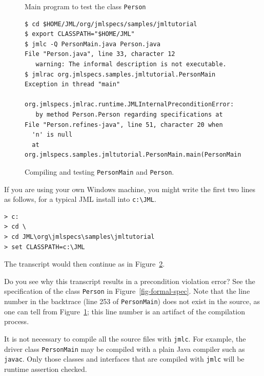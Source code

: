 \documentclass[twocolumn]{article}
\begin{document}
\begin{figure}

\caption{Main program to test the class \texttt{Person}}
\label{fig-class-personmain}
\end{figure}

\begin{figure}
\begin{verbatim}
$ cd $HOME/JML/org/jmlspecs/samples/jmltutorial
$ export CLASSPATH="$HOME/JML"
$ jmlc -Q PersonMain.java Person.java
File "Person.java", line 33, character 12
   warning: The informal description is not executable.
$ jmlrac org.jmlspecs.samples.jmltutorial.PersonMain
Exception in thread "main" 
   org.jmlspecs.jmlrac.runtime.JMLInternalPreconditionError:
   by method Person.Person regarding specifications at
File "Person.refines-java", line 51, character 20 when
  'n' is null
  at org.jmlspecs.samples.jmltutorial.PersonMain.main(PersonMain.java:253)
\end{verbatim}
\caption{Compiling and testing \texttt{PersonMain} and \texttt{Person}.}
\label{fig-class-runpersonmain}
\end{figure}

If you are using your own Windows machine, you might write the first two
lines as follows, for a typical JML install into \verb|c:\JML|.
\begin{verbatim}
> c:
> cd \
> cd JML\org\jmlspecs\samples\jmltutorial
> set CLASSPATH=c:\JML
\end{verbatim}
The transcript would then continue as in Figure~\ref{fig-class-runpersonmain}.

Do you see why this transcript results in a precondition violation
error?  See the specification of the class \texttt{Person} in
Figure~\ref{fig-formal-spec}.  Note that the line number in the
backtrace (line 253 of \texttt{PersonMain}) does not exist in the
source, as one can tell from Figure~\ref{fig-class-personmain}; this
line number is an artifact of the compilation process.

It is not necessary to compile all the
source files with \texttt{jmlc}.  For example, the driver class
\texttt{PersonMain} may be compiled with a plain Java compiler such as
\texttt{javac}. Only those classes and interfaces that are compiled
with \texttt{jmlc} will be runtime assertion checked.

\end{document}
